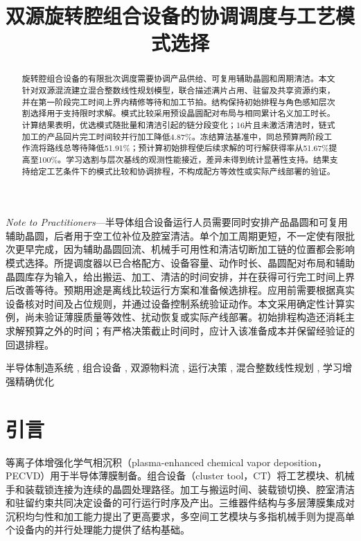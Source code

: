 \documentclass[journal]{IEEEtran}
\begin{document}
\raggedbottom
{}
\title{双源旋转腔组合设备的协调调度与工艺模式选择}
\author{}
\maketitle
\begin{abstract}
旋转腔组合设备的有限批次调度需要协调产品供给、可复用辅助晶圆和周期清洁。本文针对双源混流建立混合整数线性规划模型，联合描述满片占用、驻留及共享资源约束，并在第一阶段完工时间上界内精修等待和加工节拍。结构保持初始排程与角色感知层次割选择用于支持限时求解。模式比较采用预设晶圆配对布局与相同累计名义加工时长。计算结果表明，优选模式随批量和清洁引起的链分段变化；16片且未激活清洁时，链式加工的产品回片完工时间较并行加工降低4.87\%。冻结算法基准中，同总预算两阶段工作流将路线总等待降低51.91\%；预计算初始排程使后续求解的可行解获得率从51.67\%提高至100\%。学习选割与层次基线的观测性能接近，差异未得到统计显著性支持。结果支持给定工艺条件下的模式比较和协调排程，不构成配方等效性或实际产线部署的验证。
\end{abstract}

{\small\noindent\textit{Note to Practitioners}---半导体组合设备运行人员需要同时安排产品晶圆和可复用辅助晶圆，后者用于空工位补位及腔室清洁。单个加工周期更短，不一定使有限批次更早完成，因为辅助晶圆回流、机械手可用性和清洁切断加工链的位置都会影响模式选择。所提调度器以已合格配方、设备容量、动作时长、晶圆配对布局和辅助晶圆库存为输入，给出搬运、加工、清洁的时间安排，并在获得可行完工时间上界后改善等待。预期用途是离线比较运行方案和准备候选排程。应用前需要根据真实设备核对时间及占位规则，并通过设备控制系统验证动作。本文采用确定性计算实例，尚未验证薄膜质量等效性、扰动恢复或实际产线部署。初始排程构造还消耗主求解预算之外的时间；有严格决策截止时间时，应计入该准备成本并保留经验证的回退排程。\par}


\begin{IEEEkeywords}
半导体制造系统 , 组合设备 , 双源物料流 , 运行决策 ,
混合整数线性规划 , 学习增强精确优化
\end{IEEEkeywords}


\section{引言}

等离子体增强化学气相沉积（plasma-enhanced chemical vapor deposition，PECVD）用于半导体薄膜制备。组合设备（cluster tool，CT）将工艺模块、机械手和装载锁连接为连续的晶圆处理路径。加工与搬运时间、装载锁切换、腔室清洁和驻留约束共同决定设备的可行运行时序及产出\cite{pan2018survey}。三维器件结构与多层薄膜集成对沉积均匀性和加工能力提出了更高要求\cite{appliedprecisioncvd}，多空间工艺模块与多指机械手则为提高单个设备内的并行处理能力提供了结构基础\cite{gu2024applied,gu2024multifinger}。
\end{document}
